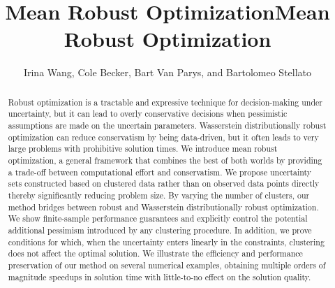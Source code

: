 \documentclass[12pt]{article}
\theoremstyle{thmstyleone}%
\theoremstyle{thmstyletwo}%
\theoremstyle{thmstylethree}%
\begin{document}
\ifpreprint
\title{Mean Robust Optimization}
\author{Irina Wang, Cole Becker, Bart Van Parys, and Bartolomeo Stellato}
\maketitle
\begin{abstract}
Robust optimization is a tractable and expressive technique for decision-making under uncertainty, but it can lead to overly conservative decisions when pessimistic assumptions are made on the uncertain parameters.
Wasserstein distributionally robust optimization can reduce conservatism by being data-driven, but it often leads to very large problems with prohibitive solution times.
We introduce mean robust optimization, a general framework that combines the best of both worlds by providing a trade-off between computational effort and conservatism.
We propose uncertainty sets constructed based on clustered data rather than on observed data points directly thereby significantly reducing problem size.
By varying the number of clusters, our method bridges between robust and Wasserstein distributionally robust optimization.
We show finite-sample performance guarantees and explicitly control the potential additional pessimism introduced by any clustering procedure.
In addition, we prove conditions for which, when the uncertainty enters linearly in the constraints, clustering does not affect the optimal solution.
We illustrate the efficiency and performance preservation of our method on several numerical examples, obtaining multiple orders of magnitude speedups in solution time with little-to-no effect on the solution quality.
\end{abstract}

\else

\title[Mean Robust Optimization]{Mean Robust Optimization}

\author[1]{ }

\author[2]{ }

\author[3]{ }

\author*[1]{ }


\end{document}
